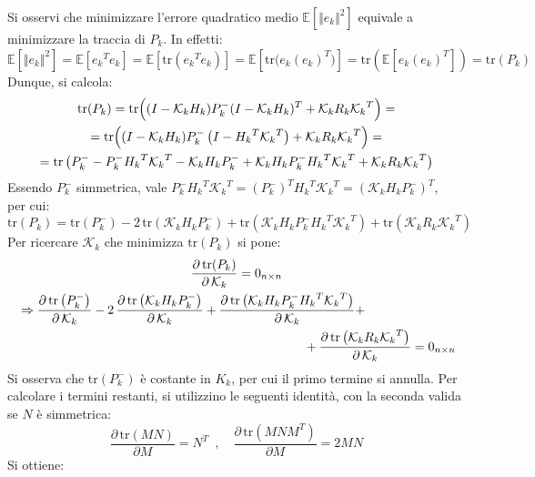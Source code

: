 \documentclass[12pt,a4paper,openright,twoside]{book}
\begin{document}
Si osservi che minimizzare l'errore quadratico medio $\mathbb{E}[\Vert e_k\Vert^2]$ equivale a minimizzare la traccia di $P_k$. In effetti:
$$\mathbb{E}[\Vert e_k\Vert^2]=\mathbb{E}[{e_k}^Te_k]=\mathbb{E}[\mathrm{tr}({e_k}^Te_k)]=\mathbb{E}\left[\mathrm{tr}\bigl(e_k(e_k)^T\bigr)\right]=\mathrm{tr}\left(\mathbb{E}\left[e_k(e_k)^T\right]\right)=\mathrm{tr}(P_k)$$
Dunque, si calcola:
\begin{gather*}
\mathrm{tr}(P_k)=\mathrm{tr}\Bigl((I-\mathcal{K}_kH_k)P_k^-(I-\mathcal{K}_kH_k)^T+\mathcal{K}_kR_k{\mathcal{K}_k}^T\Bigr)= \\
=\mathrm{tr}\Bigl((I-\mathcal{K}_kH_k)P_k^-\left(I-{H_k}^T{\mathcal{K}_k}^T\right)+\mathcal{K}_kR_k{\mathcal{K}_k}^T\Bigr)= \\
=\mathrm{tr}\left(P_k^--P_k^-{H_k}^T{\mathcal{K}_k}^T-\mathcal{K}_kH_kP_k^-+\mathcal{K}_kH_kP_k^-{H_k}^T{\mathcal{K}_k}^T+\mathcal{K}_kR_k{\mathcal{K}_k}^T\right)
\end{gather*}
Essendo $P_k^-$ simmetrica, vale $P_k^-{H_k}^T{\mathcal{K}_k}^T=(P_k^-)^T{H_k}^T{\mathcal{K}_k}^T=(\mathcal{K}_kH_kP_k^-)^T$, \\
per cui:
$$\mathrm{tr}(P_k)=\mathrm{tr}\left(P_k^-\right)-2\,\mathrm{tr}\left(\mathcal{K}_kH_kP_k^-\right)+\mathrm{tr}\left(\mathcal{K}_kH_kP_k^-{H_k}^T{\mathcal{K}_k}^T\right)+\mathrm{tr}\left(\mathcal{K}_kR_k{\mathcal{K}_k}^T\right)$$
Per ricercare $\mathcal{K}_k$ che minimizza $\mathrm{tr}(P_k)$ si pone:
\begin{gather*}
\dfrac{\partial\,\mathrm{tr}(P_k)}{\partial\,\mathcal{K}_k}=0_{n\times n} \\
\begin{multlined}[\textwidth]
\Rightarrow \dfrac{\partial\,\mathrm{tr}\left(P_k^-\right)}{\partial\,\mathcal{K}_k}-2\,\dfrac{\partial\,\mathrm{tr}\left(\mathcal{K}_kH_kP_k^-\right)}{\partial\,\mathcal{K}_k}+\dfrac{\partial\,\mathrm{tr}\left(\mathcal{K}_kH_kP_k^-{H_k}^T{\mathcal{K}_k}^T\right)}{\partial\,\mathcal{K}_k}+ \\
+\dfrac{\partial\,\mathrm{tr}\left(\mathcal{K}_kR_k{\mathcal{K}_k}^T\right)}{\partial\,\mathcal{K}_k}=0_{n\times n}
\end{multlined}
\end{gather*}
Si osserva che $\mathrm{tr}(P_k^-)$ è costante in $K_k$, per cui il primo termine si annulla. Per calcolare i termini restanti, si utilizzino le seguenti identità, con la seconda valida se $N$ è simmetrica:
$$\dfrac{\partial\,\mathrm{tr}(MN)}{\partial M}=N^T\enspace,\quad\dfrac{\partial\,\mathrm{tr}(MNM^T)}{\partial M}=2MN$$
Si ottiene:
\end{document}
